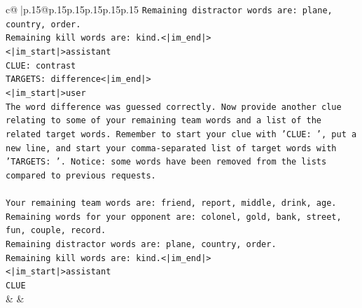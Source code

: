 \documentclass{article}
\begin{document}
{\begin{supertabular}{c@{$\;$}|p{.15\linewidth}@{}p{.15\linewidth}p{.15\linewidth}p{.15\linewidth}p{.15\linewidth}p{.15\linewidth}}
{{{\texttt{Remaining distractor words are: plane, country, order.} \\
\texttt{Remaining kill words are: kind.<|im\_end|>} \\
\texttt{<|im\_start|>assistant} \\
\texttt{CLUE: contrast} \\
\texttt{TARGETS: difference<|im\_end|>} \\
\texttt{<|im\_start|>user} \\
\texttt{The word difference was guessed correctly. Now provide another clue relating to some of your remaining team words and a list of the related target words. Remember to start your clue with 'CLUE: ', put a new line, and start your comma{-}separated list of target words with 'TARGETS: '. Notice: some words have been removed from the lists compared to previous requests.} \\
\\ 
\texttt{Your remaining team words are: friend, report, middle, drink, age.} \\
\texttt{Remaining words for your opponent are: colonel, gold, bank, street, fun, couple, record.} \\
\texttt{Remaining distractor words are: plane, country, order.} \\
\texttt{Remaining kill words are: kind.<|im\_end|>} \\
\texttt{<|im\_start|>assistant} \\
\texttt{CLUE} \\
            }
        }
    }
    & & \\ \\


\end{supertabular}}
\end{document}
